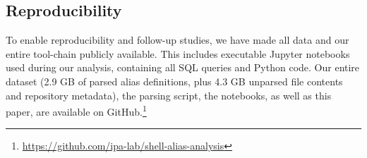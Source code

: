\subsection{Reproducibility}

To enable reproducibility and follow-up studies, we have made all data and our entire tool-chain publicly available.
This includes executable Jupyter notebooks used during our analysis, containing all SQL queries and Python code.
Our entire dataset (2.9 GB of parsed alias definitions, plus 4.3 GB unparsed file contents and repository metadata), the parsing script, the notebooks, as well as this paper, are available on GitHub.\footnote{\url{https://github.com/ipa-lab/shell-alias-analysis}}

